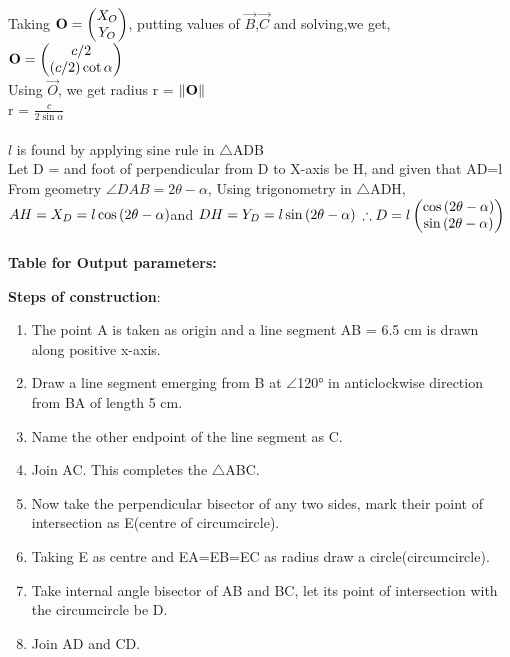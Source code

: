 \documentclass[journal,12pt,twocolumn]{IEEEtran}
\renewcommand\thesection{\arabic{section}}
\begin{document}
\begin{enumerate}[label=\thesection.\arabic*.,ref=\thesection.\theenumi]
Taking $\mathbf{O} = \begin{pmatrix}X_O \\ Y_O\end{pmatrix}$, putting values of $\vec{B}$,$\vec{C}$ and solving,we get,\\
$\mathbf{O} = \begin{pmatrix}c/2 \\ \left(c/2\right) \cot \alpha\end{pmatrix} $ \\
Using $\vec{O}$, we get radius r = $\left\lVert\mathbf{O}\right\rVert$\\
r = $\frac{c}{2\sin \alpha}$\\
\\
$l$ is found by applying sine rule in $\bigtriangleup$ADB\\
Let D =  and foot of perpendicular from D to X-axis be H,
and given that AD=l\\
From geometry $\angle DAB = 2\theta-\alpha$,
Using trigonometry in $\bigtriangleup$ADH, 
$AH=X_D=l\cos \left(2\theta-\alpha\right)$and $DH=Y_D=l\sin \left(2\theta-\alpha\right)$
$\therefore D = l\begin{pmatrix}\cos \left(2\theta-\alpha\right) \\ \sin \left(2\theta-\alpha\right)\end{pmatrix} $\\
\\

\textbf{Table for Output parameters:}
\begin{table}[h]
\centering
\caption{}
 	
\end{table}

\textbf{Steps of construction}:\\
\begin{enumerate}
\item
The point A is taken as origin and a line segment AB = 6.5 cm is drawn along positive x-axis.\\
\item
Draw a line segment emerging from B at $\angle$120° in anticlockwise direction from BA of length 5 cm.\\
\item
Name the other endpoint of the line segment as C.\\
\item
Join AC. This completes the $\bigtriangleup$ABC.\\
\item
Now take the perpendicular bisector of any two sides, mark their point of intersection as E(centre of circumcircle).\\
\item
Taking E as centre and EA=EB=EC as radius draw a circle(circumcircle).\\
\item
Take internal angle bisector of AB and BC, let its point of intersection with the circumcircle be D.\\
\item
Join AD and CD.\\
\end{enumerate}


\end{enumerate}
\end{document}
